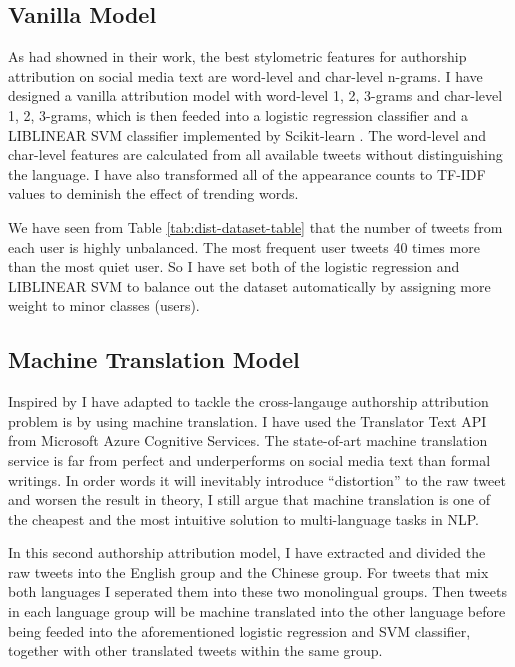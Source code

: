 \documentclass[11pt,a4paper]{article}
\begin{document}
\subsection{Vanilla Model}

As \citet{rocha2016authorship} had showned in their work, the best stylometric features for authorship attribution on social media text are word-level and char-level n-grams. I have designed a vanilla attribution model with word-level 1, 2, 3-grams and char-level 1, 2, 3-grams, which is then feeded into a logistic regression classifier and a LIBLINEAR\cite{REF08a} SVM classifier implemented by Scikit-learn \cite{scikit-learn}. The word-level and char-level features are calculated from all available tweets without distinguishing the language. I have also transformed all of the appearance counts to TF-IDF values to deminish the effect of trending words.

We have seen from Table \ref{tab:dist-dataset-table} that the number of tweets from each user is highly unbalanced. The most frequent user tweets 40 times more than the most quiet user. So I have set both of the logistic regression and LIBLINEAR SVM to balance out the dataset automatically by assigning more weight to minor classes (users).

\subsection{Machine Translation Model}

Inspired by \citet{bogdanova2014cross} I have adapted to tackle the cross-langauge authorship attribution problem is by using machine translation. I have used the Translator Text API from Microsoft Azure Cognitive Services. The state-of-art machine translation service is far from perfect and underperforms on social media text than formal writings. In order words it will inevitably introduce ``distortion'' to the raw tweet and worsen the result in theory, I still argue that machine translation is one of the cheapest and the most intuitive solution to multi-language tasks in NLP.

In this second authorship attribution model, I have extracted and divided the raw tweets into the English group and the Chinese group. For tweets that mix both languages I seperated them into these two monolingual groups. Then tweets in each language group will be machine translated into the other language before being feeded into the aforementioned logistic regression and SVM classifier, together with other translated tweets within the same group.
\end{document}
